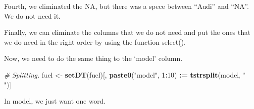 \documentclass[]{book}
\newenvironment{Shaded}{\begin{snugshade}}{\end{snugshade}}
\newcommand{\CommentTok}[1]{\textcolor[rgb]{0.56,0.35,0.01}{\textit{#1}}}
\newcommand{\DecValTok}[1]{\textcolor[rgb]{0.00,0.00,0.81}{#1}}
\newcommand{\ErrorTok}[1]{\textcolor[rgb]{0.64,0.00,0.00}{\textbf{#1}}}
\newcommand{\KeywordTok}[1]{\textcolor[rgb]{0.13,0.29,0.53}{\textbf{#1}}}
\newcommand{\NormalTok}[1]{#1}
\newcommand{\OperatorTok}[1]{\textcolor[rgb]{0.81,0.36,0.00}{\textbf{#1}}}
\newcommand{\StringTok}[1]{\textcolor[rgb]{0.31,0.60,0.02}{#1}}
\begin{document}
Fourth, we eliminated the NA, but there was a spece between ``Audi'' and ``NA''. We do not need it.

\begin{Shaded}
\end{Shaded}

Finally, we can eliminate the columns that we do not need and put the ones that we do need in the right order by using the function select().

\begin{Shaded}
\end{Shaded}

Now, we need to do the same thing to the `model' column.

\begin{Shaded}
\begin{Highlighting}[]
\CommentTok{# Splitting.}
\NormalTok{fuel <-}\StringTok{ }\KeywordTok{setDT}\NormalTok{(fuel)[, }\KeywordTok{paste0}\NormalTok{(}\StringTok{"model"}\NormalTok{, }\DecValTok{1}\OperatorTok{:}\DecValTok{10}\NormalTok{) }\OperatorTok{:}\ErrorTok{=}\StringTok{ }\KeywordTok{tstrsplit}\NormalTok{(model, }\StringTok{" "}\NormalTok{)]}
\end{Highlighting}
\end{Shaded}

In model, we just want one word.
\end{document}
